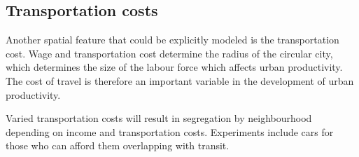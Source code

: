 \subsection{Transportation costs} %

Another spatial feature that could be explicitly modeled is %
the transportation cost. Wage and transportation cost determine the radius of the circular city, which determines the size of the labour force which affects urban productivity. The cost of travel is therefore an important variable in the development of urban productivity. 


Varied transportation costs will result in segregation by neighbourhood depending on income and transportation costs. Experiments include cars for those who can afford them overlapping with transit. %

